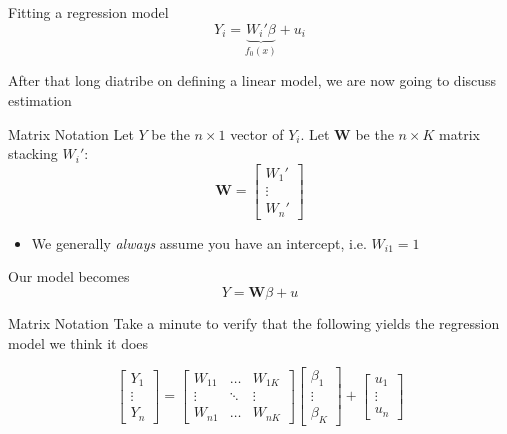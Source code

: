 \documentclass[aspectratio=169,t,11pt,table]{beamer}
\begin{document}
\begin{frame}{Fitting a regression model}
  \vspace*{-\bigskipamount}
  $$
    Y_i = \underbrace{W_i' \beta}_{f_0(x)} + u_i
  $$

  After that long diatribe on defining a linear model, we are now going to discuss estimation


\end{frame}

\begin{frame}{Matrix Notation}
  Let $Y$ be the $n \times 1$ vector of $Y_i$. Let $\bm{W}$ be the $n \times K$ matrix stacking $W_i'$:
  $$
    \bm{W} = \begin{bmatrix}
      W_1' \\ 
      \vdots \\
      W_n'
    \end{bmatrix}
  $$
  \begin{itemize}
    \item We generally \emph{always} assume you have an intercept, i.e. $W_{i1} = 1$
  \end{itemize}

  \bigskip
  Our model becomes 
  $$
    Y = \bm{W} \beta + u
  $$
\end{frame}

\begin{frame}{Matrix Notation}
  Take a minute to verify that the following yields the regression model we think it does

  $$
    \begin{bmatrix}Y_1 \\ \vdots \\ Y_n \end{bmatrix} =
    \begin{bmatrix}
      W_{11} & \dots & W_{1K} \\ 
      \vdots & \ddots & \vdots \\ 
      W_{n1} & \dots & W_{nK}
    \end{bmatrix} 
    \begin{bmatrix}\beta_1 \\ \vdots \\ \beta_K \end{bmatrix} + 
    \begin{bmatrix}u_1 \\ \vdots \\ u_n \end{bmatrix}
  $$  
\end{frame}
\end{document}
